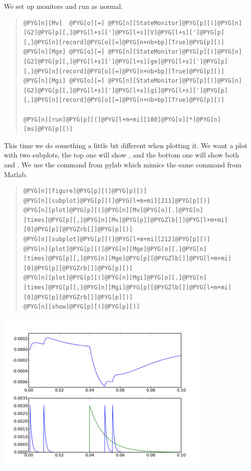 \documentclass[letterpaper,10pt,english]{manual}
\begin{document}
We set up monitors and run as normal.
\begin{quote}

\begin{Verbatim}[commandchars=@\[\]]
@PYG[n][Mv]  @PYG[o][=] @PYG[n][StateMonitor]@PYG[p][(]@PYG[n][G2]@PYG[p][,]@PYG[l+s][']@PYG[l+s][V]@PYG[l+s][']@PYG[p][,]@PYG[n][record]@PYG[o][=]@PYG[n+nb+bp][True]@PYG[p][)]
@PYG[n][Mge] @PYG[o][=] @PYG[n][StateMonitor]@PYG[p][(]@PYG[n][G2]@PYG[p][,]@PYG[l+s][']@PYG[l+s][ge]@PYG[l+s][']@PYG[p][,]@PYG[n][record]@PYG[o][=]@PYG[n+nb+bp][True]@PYG[p][)]
@PYG[n][Mgi] @PYG[o][=] @PYG[n][StateMonitor]@PYG[p][(]@PYG[n][G2]@PYG[p][,]@PYG[l+s][']@PYG[l+s][gi]@PYG[l+s][']@PYG[p][,]@PYG[n][record]@PYG[o][=]@PYG[n+nb+bp][True]@PYG[p][)]

@PYG[n][run]@PYG[p][(]@PYG[l+m+mi][100]@PYG[o][*]@PYG[n][ms]@PYG[p][)]
\end{Verbatim}
\end{quote}

This time we do something a little bit different when plotting it. We want
a plot with two subplots, the top one will show , and the bottom one will
show both  and . We use the  command from pylab which mimics the
same command from Matlab.
\begin{quote}

\begin{Verbatim}[commandchars=@\[\]]
@PYG[n][figure]@PYG[p][(]@PYG[p][)]
@PYG[n][subplot]@PYG[p][(]@PYG[l+m+mi][211]@PYG[p][)]
@PYG[n][plot]@PYG[p][(]@PYG[n][Mv]@PYG[o][.]@PYG[n][times]@PYG[p][,]@PYG[n][Mv]@PYG[p][@PYGZlb[]]@PYG[l+m+mi][0]@PYG[p][@PYGZrb[]]@PYG[p][)]
@PYG[n][subplot]@PYG[p][(]@PYG[l+m+mi][212]@PYG[p][)]
@PYG[n][plot]@PYG[p][(]@PYG[n][Mge]@PYG[o][.]@PYG[n][times]@PYG[p][,]@PYG[n][Mge]@PYG[p][@PYGZlb[]]@PYG[l+m+mi][0]@PYG[p][@PYGZrb[]]@PYG[p][)]
@PYG[n][plot]@PYG[p][(]@PYG[n][Mgi]@PYG[o][.]@PYG[n][times]@PYG[p][,]@PYG[n][Mgi]@PYG[p][@PYGZlb[]]@PYG[l+m+mi][0]@PYG[p][@PYGZrb[]]@PYG[p][)]
@PYG[n][show]@PYG[p][(]@PYG[p][)]
\end{Verbatim}
\end{quote}

\includegraphics{2b.jpg}
\end{document}
